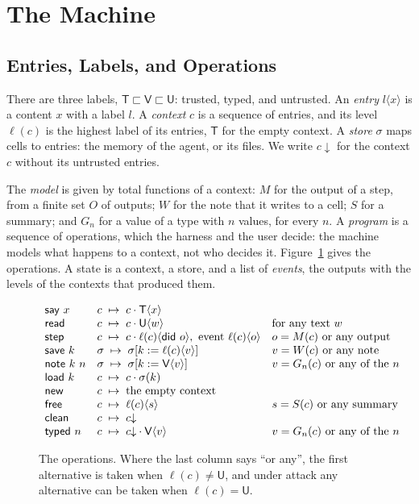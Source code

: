 \documentclass[acmsmall,nonacm,screen]{acmart}
\newcommand{\kw}[1]{\mathsf{#1}}
\newcommand{\T}{\kw{T}}
\newcommand{\V}{\kw{V}}
\newcommand{\U}{\kw{U}}
\newcommand{\lev}[1]{\ell(#1)}
\newcommand{\ent}[2]{#1\langle #2 \rangle}
\newcommand{\op}[1]{\kw{#1}}
\newcommand{\keep}[1]{#1{\downarrow}}
\begin{document}
\section{The Machine}
\label{sec:machine}

\subsection{Entries, Labels, and Operations}

There are three labels, $\T \sqsubset \V \sqsubset \U$: trusted, typed, and untrusted. An
\emph{entry} $\ent{l}{x}$ is a content $x$ with a label $l$. A \emph{context} $c$ is a
sequence of entries, and its level $\lev{c}$ is the highest label of its entries, $\T$ for
the empty context. A \emph{store} $\sigma$ maps cells to entries: the memory of the agent, or
its files. We write $\keep{c}$ for the context $c$ without its untrusted entries.

The \emph{model} is given by total functions of a context: $M$ for the output of a step,
from a finite set $O$ of outputs; $W$ for the note that it writes to a cell; $S$ for a
summary; and $G_n$ for a value of a type with $n$ values, for every $n$. A \emph{program} is
a sequence of operations, which the harness and the user decide: the machine models what
happens to a context, not who decides it. Figure~\ref{fig:machine} gives the operations. A
state is a context, a store, and a list of \emph{events}, the outputs with the levels of the
contexts that produced them.

\begin{figure}
\[
\begin{array}{l@{\quad}l@{\quad}l}
\op{say}\ x & c \;\mapsto\; c \cdot \ent{\T}{x} & \\
\op{read} & c \;\mapsto\; c \cdot \ent{\U}{w} & \text{for any text } w \\
\op{step} & c \;\mapsto\; c \cdot \ent{\lev{c}}{\op{did}\ o},\ \text{event } \ent{\lev{c}}{o} & o = M(c) \text{ or any output} \\
\op{save}\ k & \sigma \;\mapsto\; \sigma[k := \ent{\lev{c}}{v}] & v = W(c) \text{ or any note} \\
\op{note}\ k\ n & \sigma \;\mapsto\; \sigma[k := \ent{\V}{v}] & v = G_n(c) \text{ or any of the } n \\
\op{load}\ k & c \;\mapsto\; c \cdot \sigma(k) & \\
\op{new} & c \;\mapsto\; \text{the empty context} & \\
\op{free} & c \;\mapsto\; \ent{\lev{c}}{s} & s = S(c) \text{ or any summary} \\
\op{clean} & c \;\mapsto\; \keep{c} & \\
\op{typed}\ n & c \;\mapsto\; \keep{c} \cdot \ent{\V}{v} & v = G_n(c) \text{ or any of the } n
\end{array}
\]
\caption{The operations. Where the last column says ``or any'', the first alternative is
taken when $\lev{c} \neq \U$, and under attack any alternative can be taken when $\lev{c} =
\U$.}
\label{fig:machine}
\end{figure}
\end{document}
